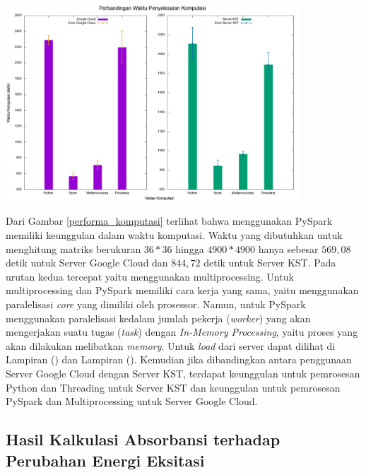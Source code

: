 \documentclass[12pt,a4paper]{report}
\begin{document}
\begin{center}
	\includegraphics[width=11cm]{gambar/performa_komputasi.png}
	\label{performa_komputasi}
\end{center}

Dari Gambar \ref{performa_komputasi} terlihat bahwa menggunakan PySpark memiliki keunggulan dalam waktu komputasi. Waktu yang dibutuhkan untuk menghitung matriks berukuran $36*36$ hingga $4900*4900$ hanya sebesar $569,08$ detik untuk Server Google Cloud dan $844,72$ detik untuk Server KST. Pada urutan kedua tercepat yaitu menggunakan multiprocessing. Untuk multiprocessing dan PySpark memiliki cara kerja yang sama, yaitu menggunakan paralelisasi \textit{core} yang dimiliki oleh prosessor. Namun, untuk PySpark menggunakan paralelisasi kedalam jumlah pekerja (\textit{worker}) yang akan mengerjakan suatu tugas (\textit{task}) dengan \textit{In-Memory Processing}, yaitu proses yang akan dilakukan melibatkan \textit{memory}. Untuk \textit{load} dari server dapat dilihat di Lampiran () dan Lampiran (). Kemudian jika dibandingkan antara penggunaan Server Google Cloud dengan Server KST, terdapat keunggulan untuk pemrosesan Python dan Threading untuk Server KST dan keunggulan untuk pemrosesan PySpark dan Multiprocessing untuk Server Google Cloud.

\subsection{Hasil Kalkulasi Absorbansi terhadap Perubahan Energi Eksitasi}
\end{document}
